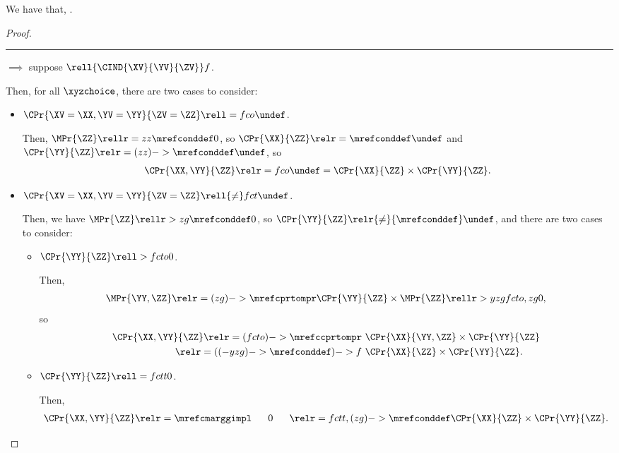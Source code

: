 \begin{proposition}
  We have that, \indproddef.%
\end{proposition}

\begin{proof}
  \hrule
  $\implies$ suppose $\rell {\CIND{\XV}{\YV}{\ZV}} f $.

  Then, for all $\xyzchoice$, there are two cases to consider:
  \begin{itemize}
    \item {} $\CPr{\XV = \XX, \YV = \YY}{\ZV = \ZZ} \rell = fco \undef$.

      Then, 
      $\MPr{\ZZ} \rellr = zz {\mrefconddef} 0$,
      so
      $\CPr{\XX}{\ZZ} \relr = {\mrefconddef} \undef$
      and
      $\CPr{\YY}{\ZZ} \relr = {(zz)->\mrefconddef} \undef$, so
      \begin{align*}
        \CPr{\XX, \YY}{\ZZ}  \relr = fco \undef =
        \CPr{\XX}{\ZZ} \times \CPr{\YY}{\ZZ}.
      \end{align*}
    \item {} $\CPr{\XV = \XX, \YV = \YY}{\ZV = \ZZ} \rell {\ne} fct \undef$.

      Then, we have $\MPr{\ZZ} \rellr > zg {\mrefconddef} 0$, so $\CPr{\YY}{\ZZ} \relr {\ne} {\mrefconddef} \undef$, and there are two cases to consider:
      \begin{itemize}
        \item {} $\CPr{\YY}{\ZZ} \rell > fcto 0$.

        Then,
        \begin{align*}
          \MPr{\YY, \ZZ} \relr = {(zg)->\mrefcprtompr}
          \CPr{\YY}{\ZZ} \times \MPr{\ZZ} \rellr > yzg {fcto,zg} 0,
        \end{align*}
        so
        \begin{align*}
          \CPr{\XX, \YY}{\ZZ} 
          \relr = {(fcto)->\mrefccprtompr} &\ \CPr{\XX}{\YY, \ZZ} \times \CPr{\YY}{\ZZ}\\
          \relr = {((-yzg)->\mrefconddef)->f} &\ \CPr{\XX}{\ZZ} \times \CPr{\YY}{\ZZ}.
        \end{align*}

        \item {} $\CPr{\YY}{\ZZ} \rell = {fctt} 0$.

        Then,
        \begin{align*}
          \CPr{\XX, \YY}{\ZZ} \relr = {\mrefcmarggimpl} \ \ \ \ \ 0\ \ \ \ \  
          \relr = {fctt,(zg)->\mrefconddef} \CPr{\XX}{\ZZ} \times \CPr{\YY}{\ZZ}.
        \end{align*}
      \end{itemize}
  \end{itemize}


\end{proof}

